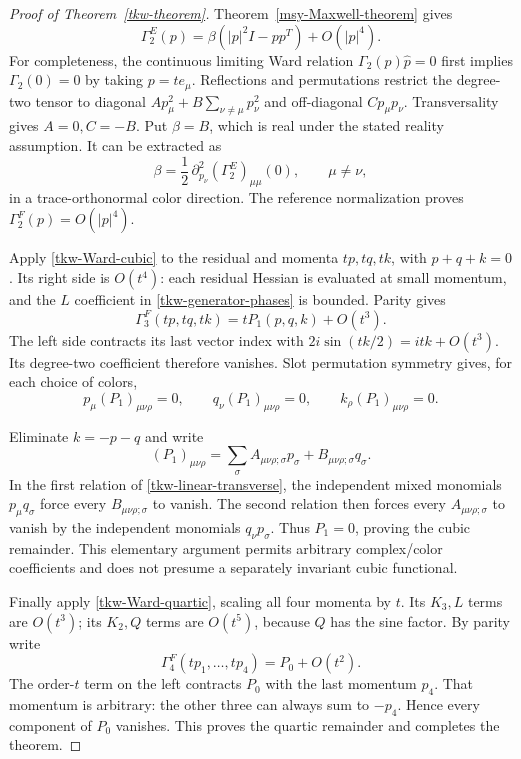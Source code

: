 \documentclass[11pt]{article}
\theoremstyle{remark}
\begin{document}
\begin{proof}[Proof of Theorem~\ref{tkw-theorem}]
Theorem~\ref{msy-Maxwell-theorem} gives
\[
 \Gamma_2^E(p)=\beta(|p|^2I-pp^T)+O(|p|^4).
\]
For completeness, the continuous limiting Ward relation
\(\Gamma_2(p)\widehat p=0\) first implies \(\Gamma_2(0)=0\)
by taking \(p=te_\mu\). Reflections and permutations restrict
the degree-two tensor to diagonal
\(A p_\mu^2+B\sum_{\nu\ne\mu}p_\nu^2\) and off-diagonal
\(C p_\mu p_\nu\). Transversality gives \(A=0,C=-B\).
Put \(\beta=B\), which is real under the stated reality
assumption. It can be extracted as
\begin{equation}
 \beta=\frac12\,
  \partial_{p_\nu}^2(\Gamma_2^E)_{\mu\mu}(0),
       \qquad \mu\ne\nu,
 \label{tkw-beta}
\end{equation}
in a trace-orthonormal color direction. The reference
normalization proves \(\Gamma_2^F(p)=O(|p|^4)\).

Apply \eqref{tkw-Ward-cubic} to the residual and momenta
\(tp,tq,tk\), with \(p+q+k=0\). Its right side is \(O(t^4)\):
each residual Hessian is evaluated at small momentum, and
the \(L\) coefficient in \eqref{tkw-generator-phases} is bounded.
Parity gives
\[
 \Gamma_3^F(tp,tq,tk)=tP_1(p,q,k)+O(t^3).
\]
The left side contracts its last vector index with
\(2i\sin(tk/2)=itk+O(t^3)\). Its degree-two coefficient
therefore vanishes. Slot permutation symmetry gives, for
each choice of colors,
\begin{equation}
 p_\mu(P_1)_{\mu\nu\rho}=0,\qquad
 q_\nu(P_1)_{\mu\nu\rho}=0,\qquad
 k_\rho(P_1)_{\mu\nu\rho}=0.
 \label{tkw-linear-transverse}
\end{equation}

Eliminate \(k=-p-q\) and write
\[
 (P_1)_{\mu\nu\rho}
  =\sum_\sigma A_{\mu\nu\rho;\sigma}p_\sigma
                   +B_{\mu\nu\rho;\sigma}q_\sigma .
\]
In the first relation of \eqref{tkw-linear-transverse},
the independent mixed monomials \(p_\mu q_\sigma\)
force every \(B_{\mu\nu\rho;\sigma}\) to vanish.
The second relation then forces every \(A_{\mu\nu\rho;\sigma}\)
to vanish by the independent monomials \(q_\nu p_\sigma\).
Thus \(P_1=0\), proving the cubic remainder. This elementary
argument permits arbitrary complex/color coefficients and
does not presume a separately invariant cubic functional.

Finally apply \eqref{tkw-Ward-quartic}, scaling all four
momenta by \(t\). Its \(K_3,L\) terms are \(O(t^3)\);
its \(K_2,Q\) terms are \(O(t^5)\), because \(Q\) has
the sine factor. By parity write
\[
 \Gamma_4^F(tp_1,\ldots,tp_4)=P_0+O(t^2).
\]
The order-\(t\) term on the left contracts \(P_0\) with
the last momentum \(p_4\). That momentum is arbitrary:
the other three can always sum to \(-p_4\). Hence
every component of \(P_0\) vanishes. This proves the
quartic remainder and completes the theorem.
\end{proof}
\end{document}

